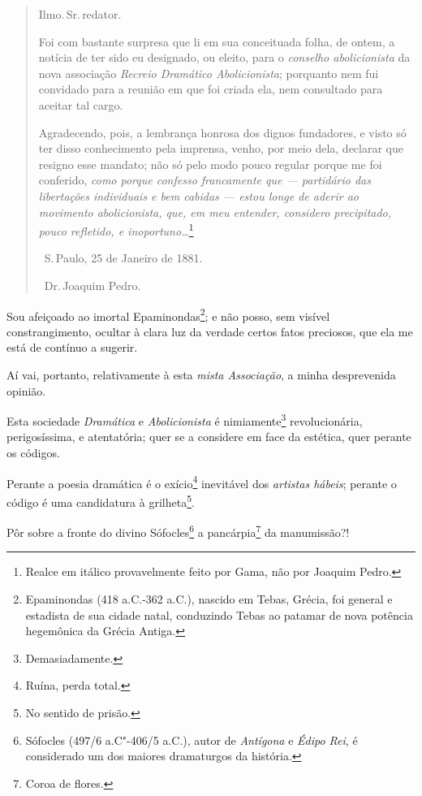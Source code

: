 \asterisc

\begin{quote}
Ilmo.\,Sr.\,redator.

Foi com bastante surpresa que li em sua conceituada folha, de ontem, a
notícia de ter sido eu designado, ou eleito, para o \emph{conselho
abolicionista} da nova associação \emph{Recreio Dramático
Abolicionista}; porquanto nem fui convidado para a reunião em que foi
criada ela, nem consultado para aceitar tal cargo.

Agradecendo, pois, a lembrança honrosa dos dignos fundadores, e visto só
ter disso conhecimento pela imprensa, venho, por meio dela, declarar que
resigno esse mandato; não só pelo modo pouco regular porque me foi
conferido, \emph{como porque confesso francamente que --- partidário
das libertações individuais e bem cabidas --- estou longe de aderir ao
movimento abolicionista, que, em meu entender, considero precipitado,
pouco refletido, e inoportuno\ldots{}}\footnote{Realce em itálico
  provavelmente feito por Gama, não por Joaquim Pedro.}

\hfill\ S.\,Paulo, 25 de Janeiro de 1881.

\hfill\ Dr.\,Joaquim Pedro.
\end{quote}

Sou afeiçoado ao imortal Epaminondas\footnote{Epaminondas (418
  a.C.-362 a.C.), nascido em Tebas, Grécia, foi general e estadista de
  sua cidade natal, conduzindo Tebas ao patamar de nova
  potência hegemônica da Grécia Antiga.}; e não posso, sem visível
constrangimento, ocultar à clara luz da verdade certos fatos preciosos,
que ela me está de contínuo a sugerir.

Aí vai, portanto, relativamente à esta \emph{mista Associação}, a minha
desprevenida opinião.

Esta sociedade \emph{Dramática} e \emph{Abolicionista} é
nimiamente\footnote{Demasiadamente.} revolucionária, perigosíssima, e
atentatória; quer se a considere em face da estética, quer perante os
códigos.

Perante a poesia dramática é o exício\footnote{Ruína, perda total.}
inevitável dos \emph{artistas hábeis}; perante o código é uma
candidatura à grilheta\footnote{No sentido de prisão.}.

Pôr sobre a fronte do divino Sófocles\footnote{Sófocles (497/6
  a.C"-406/5 a.C.), autor de \emph{Antígona} e \emph{Édipo Rei}, é
  considerado um dos maiores dramaturgos da história.} a
pancárpia\footnote{Coroa de flores.} da manumissão?!

